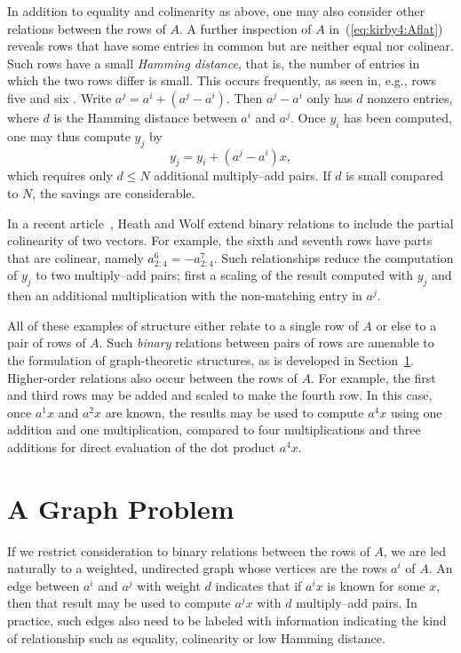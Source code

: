 In addition to equality and colinearity as above, one may also
consider other relations between the rows of $A$. A further inspection
of $A$ in~(\ref{eq:kirby4:Aflat}) reveals rows that have some entries
in common but are neither equal nor colinear. Such rows have a small
\emph{Hamming distance}, that is, the number of entries in which the
two rows differ is small. This occurs frequently, as seen in, e.g.,
rows five and six . Write \( a^j = a^i + (a^j-a^i) \). Then \( a^j -a^i
\) only has \( d \) nonzero entries, where $d$ is the Hamming distance
between $a^i$ and $a^j$.  Once \( y_i \) has been computed, one may
thus compute $y_j$ by
\[
y_j = y_i + \left( a^j - a^i \right) x,
\]
which requires only \( d \leq N \) additional multiply--add pairs. If
\( d \) is small compared to \( N \), the savings are considerable.

In a recent article~\cite{WolfHeath2009}, Heath and Wolf extend binary
relations to include the partial colinearity of two vectors.  For
example, the sixth and seventh rows have parts that are colinear,
namely \(a^6_{2:4} = - a^7_{2:4}\). Such relationships reduce the
computation of \(y_j\) to two multiply--add pairs; first a scaling of
the result computed with $y_j$ and then an additional multiplication
with the non-matching entry in $a^j$.

All of these examples of structure either relate to a single row of \(
A \) or else to a pair of rows of \( A \). Such \emph{binary}
relations between pairs of rows are amenable to the formulation of
graph-theoretic structures, as is developed in
Section~\ref{sec:kirby4:graph}. Higher-order relations also occur
between the rows of \( A \).  For example, the first and third rows
may be added and scaled to make the fourth row.  In this case, once \(
a^1 x \) and \( a^2 x \) are known, the results may be used to
compute \( a^{4} x \) using one addition and one multiplication,
compared to four multiplications and three additions for direct
evaluation of the dot product $a^{4} x$.

\section{A Graph Problem}
\label{sec:kirby4:graph}

If we restrict consideration to binary relations between the rows of
\( A \), we are led naturally to a weighted, undirected graph whose
vertices are the rows \( a^i \) of $A$.  An edge between \( a^i \) and
\( a^j \) with weight \( d \) indicates that if \( a^i x \) is known
for some \( x \), then that result may be used to compute \( a^j x \)
with \( d \) multiply--add pairs.  In practice, such edges also need to
be labeled with information indicating the kind of relationship such
as equality, colinearity or low Hamming distance.

